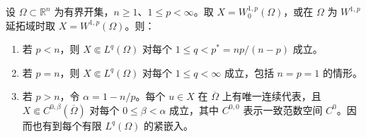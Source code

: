 \begin{theorem}[Rellich 紧性]\label{g3:thm:rellich-domain}
	设 \(\Omega\subset\mathbb R^n\) 为有界开集，\(n\ge1\)、\(1\le p<\infty\)。取 \(X=W^{1,p}_0(\Omega)\)，或在 \(\Omega\) 为 \(W^{1,p}\) 延拓域时取 \(X=W^{1,p}(\Omega)\)。则：
	\begin{enumerate}
		\item 若 \(p<n\)，则 \(X\Subset L^q(\Omega)\) 对每个 \(1\le q<p^*=np/(n-p)\) 成立。
		\item 若 \(p=n\)，则 \(X\Subset L^q(\Omega)\) 对每个 \(1\le q<\infty\) 成立，包括 \(n=p=1\) 的情形。
		\item 若 \(p>n\)，令 \(\alpha=1-n/p\)。每个 \(u\in X\) 在 \(\overline\Omega\) 上有唯一连续代表，且 \(X\Subset C^{0,\beta}(\overline\Omega)\) 对每个 \(0\le\beta<\alpha\) 成立，其中 \(C^{0,0}\) 表示一致范数空间 \(C^0\)。因而也有到每个有限 \(L^q(\Omega)\) 的紧嵌入。
	\end{enumerate}
\end{theorem}
